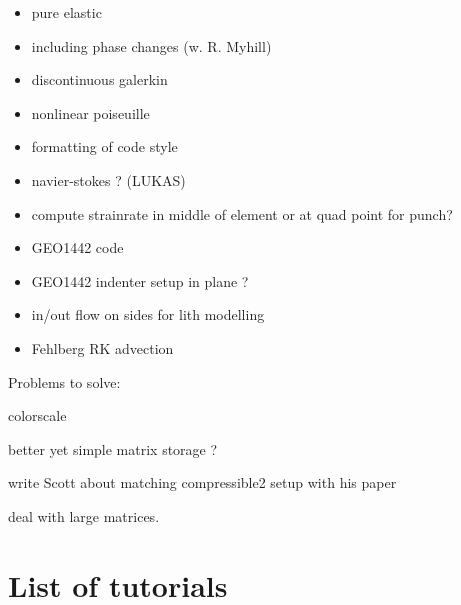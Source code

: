 \documentclass[a4paper]{article}
\begin{document}
\begin{itemize}
\item
pure elastic 

\item
including phase changes (w. R. Myhill)

\item
discontinuous galerkin

\item
nonlinear poiseuille

\item
formatting of code style

\item
navier-stokes ? (LUKAS)

\item
compute strainrate in middle of element or at quad point for punch?

\item
GEO1442 code 

\item
GEO1442 indenter setup in plane ?

\item
in/out flow on sides for lith modelling

\item
Fehlberg RK advection

\end{itemize}


\noindent Problems to solve:

colorscale 

better yet simple matrix storage ?

write Scott about matching compressible2 setup with his paper

deal with large matrices. 

\newpage
\section{List of tutorials}
\end{document}
